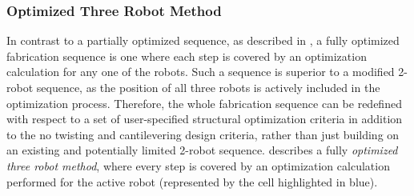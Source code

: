 \subsubsection{Optimized Three Robot Method}\label{sec:5_3rob}
In contrast to a partially optimized sequence, as described in , a fully optimized fabrication sequence is one where each step is covered by an optimization calculation for any one of the robots. Such a sequence is superior to a modified 2-robot sequence, as the position of all three robots is actively included in the optimization process. Therefore, the whole fabrication sequence can be redefined with respect to a set of user-specified structural optimization criteria in addition to the no twisting and cantilevering design criteria, rather than just building on an existing and potentially limited 2-robot sequence.  describes a fully \textit{optimized three robot method}, where every step is covered by an optimization calculation performed for the active robot (represented by the cell highlighted in blue).

